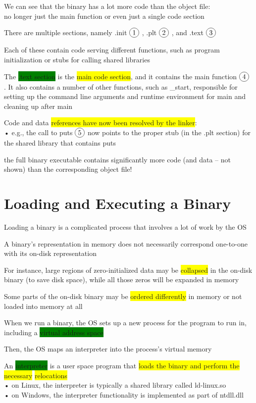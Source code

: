 \documentclass[]{project_plan}
\newcommand*\circled[1]{\tikz[baseline=(char.base)]{
            \node[shape=circle,draw,inner sep=2pt] (char) {#1};}}
\begin{document}
We can see that the binary has a lot more code than the object file:\\
no longer just the main function or even just a single code section

There are multiple sections, namely .init $\circled{1}$ , .plt $\circled{2}$ , and .text $\circled{3}$

Each of these contain code serving different functions, such as program initialization or stubs
for calling shared libraries

The \colorbox{green}{.text section} is the \colorbox{yellow}{main code section}, and it contains the main function $\circled{4}$
. It also contains a number of other functions, such as \_start,
responsible for setting up the command line arguments and runtime environment
for main and cleaning up after main

Code and data \colorbox{yellow}{references have now been resolved by the linker}:\\
• e.g., the call to puts $\circled{5}$ now points to the proper stub
(in the .plt section) for the shared library that contains
puts

the full binary executable contains significantly more code
(and data – not shown) than the corresponding object file!

\section{Loading and Executing a Binary}

Loading a binary is a complicated process that involves a lot of work by the OS

A binary’s representation in memory does not necessarily correspond
one-to-one with its on-disk representation

For instance, large regions of zero-initialized data may be \colorbox{yellow}{collapsed} in the
on-disk binary (to save disk space), while all those zeros will be expanded
in memory

Some parts of the on-disk binary may be \colorbox{yellow}{ordered differently} in memory or
not loaded into memory at all

When we run a binary, the OS sets up a new process for the program to run in,
including a \colorbox{green}{virtual address space}

Then, the OS maps an interpreter into the process’s virtual memory

An \colorbox{green}{interpreter} is a user space program that \colorbox{yellow}{loads the binary and perform the necessary} \colorbox{yellow}{relocations}\\
• on Linux, the interpreter is typically a shared library called ld-linux.so\\
• on Windows, the interpreter functionality is implemented as part of ntdll.dll
\end{document}

